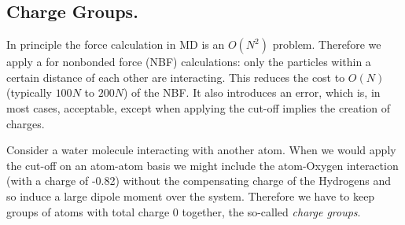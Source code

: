 \subsection{Charge Groups.}
\label{sec:cg}
In principle the force calculation in MD is an $O(N^2)$ problem. 
Therefore we apply a  
for nonbonded force (NBF) calculations:
only the particles within a certain distance of each other
are interacting. This reduces the cost to $O(N)$ (typically
$100N$ to $200N$) of the NBF. It also introduces an error,
which is, in most cases, acceptable, except when applying the cut-off
implies the creation of charges.

Consider a water molecule interacting with another atom. When we would apply
the cut-off on an atom-atom basis we might include the atom-Oxygen
interaction (with a charge of -0.82) without the compensating charge
of the Hydrogens and so induce a large dipole moment over the system.
Therefore we have to keep groups of atoms with total charge
0 together, the so-called {\em charge groups}.



\newcommand{\Fi}{\ve{F}_i'}
\newcommand{\Fj}{\ve{F}_j'}
\newcommand{\Fk}{\ve{F}_k'}
\newcommand{\Fl}{\ve{F}_l'}
\newcommand{\Fdum}{\ve{F}_{d}}
\newcommand{\rvik}{\ve{r}_{ik}}
\newcommand{\rvid}{\ve{r}_{id}}
\newcommand{\rvjk}{\ve{r}_{jk}}
\newcommand{\rvjl}{\ve{r}_{jl}}

